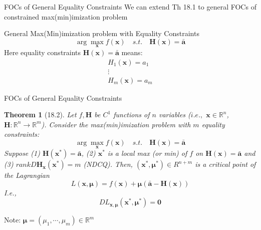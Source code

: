\documentclass[final]{beamer}
\newtheorem{thm}{Theorem}
\newcommand{\bb}{\mathbb}
\newcommand{\bd}{\mathbf}
\begin{document}
\begin{frame}[t]{FOCs of General Equality Constraints}
	We can extend Th 18.1 to general FOCs of constrained max(min)imization problem
	\begin{block}
		{General Max(Min)imization problem with Equality Constraints}
		\[
				\arg\max_{\bd{x}} f(\bd{x}) \quad s.t. \quad \bd{H}(\bd{x})=\bar{\bd{a}}
			\]
			Here equality constraints $\bd{H}(\bd{x})=\bar{\bd{a}}$ means:\[
				\begin{matrix}
					H_1(\bd{x})=a_1 \\
					\vdots\\
					H_m(\bd{x})=a_m
				\end{matrix}
			\]
	\end{block}

\end{frame}
\begin{frame}[t]{FOCs of General Equality Constraints}
	\begin{thm}
		[18.2] Let $f,\bd{H}$ be $C^1$ functions of $n$ variables ($i.e.,$ $\bd{x}\in\bb{R}^n$, $\bd{H}:\bb{R}^n\rightarrow\bb{R}^m$). Consider the max(min)imization problem with $m$ equality constraints:\[
			\arg\max_{\bd{x}} f(\bd{x}) \quad s.t.\quad \bd{H}(\bd{x})=\bar{\bd{a}}
		\]Suppose (1) $\bd{H}(\bd{x^\ast})=\bar{\bd{a}}$, (2) $\bd{x^\ast}$ is a local max (or min) of $f$ on $\bd{H}(\bd{x})=\bar{\bd{a}}$ and (3) $rank D\bd{H}_{\bd{x} }(\bd{x^\ast})=m$ (NDCQ). Then, $(\bd{x^\ast},\bd{\mu^\ast})\in{R}^{n+m}$ is a critical point of the Lagrangian\[
			L(\bd{x},\bd{\mu})=f(\bd{x})+\bd{\mu}(\bar{\bd{a}}-\bd{H}(\bd{x}))
		\]I.e.,\[
			DL_{\bd{x},\bd{\mu}}(\bd{x^\ast},\bd{\mu^\ast}) = \bd{0}
		\]
	\end{thm}
	Note: $\bd{\mu}=(\mu_1,\cdots,\mu_m)\in\bb{R}^m$
\end{frame}
\end{document}
